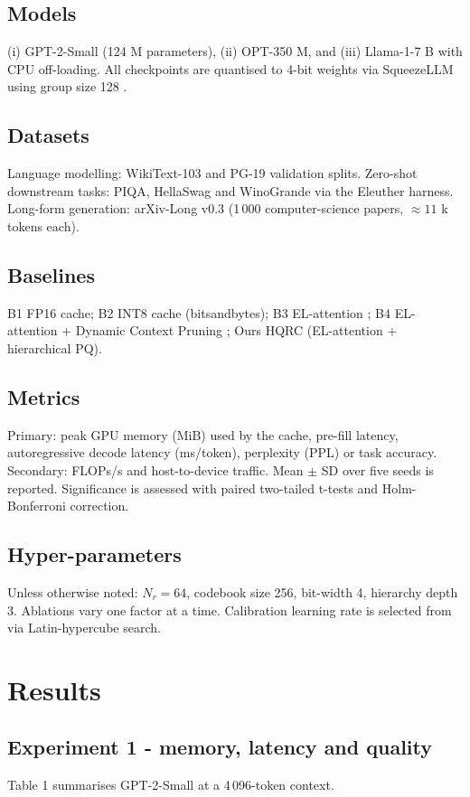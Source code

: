 \documentclass{article}
\begin{document}
\subsection{Models}
(i) GPT-2-Small (124 M parameters), (ii) OPT-350 M, and (iii) Llama-1-7 B with CPU off-loading. All checkpoints are quantised to 4-bit weights via SqueezeLLM using group size 128 \cite{kim-2023-squeezellm}.

\subsection{Datasets}
Language modelling: WikiText-103 and PG-19 validation splits. Zero-shot downstream tasks: PIQA, HellaSwag and WinoGrande via the Eleuther harness. Long-form generation: arXiv-Long v0.3 (1\,000 computer-science papers, \(\approx 11\) k tokens each).

\subsection{Baselines}
B1 FP16 cache; B2 INT8 cache (bitsandbytes); B3 EL-attention \cite{yan-2021-attention}; B4 EL-attention + Dynamic Context Pruning \cite{anagnostidis-2023-dynamic}; Ours HQRC (EL-attention + hierarchical PQ).

\subsection{Metrics}
Primary: peak GPU memory (MiB) used by the cache, pre-fill latency, autoregressive decode latency (ms/token), perplexity (PPL) or task accuracy. Secondary: FLOPs/s and host-to-device traffic. Mean \(\pm\) SD over five seeds is reported. Significance is assessed with paired two-tailed t-tests and Holm-Bonferroni correction.

\subsection{Hyper-parameters}
Unless otherwise noted: \(N_r = 64\), codebook size 256, bit-width 4, hierarchy depth 3. Ablations vary one factor at a time. Calibration learning rate is selected from via Latin-hypercube search.

\section{Results}
\subsection{Experiment 1 - memory, latency and quality}
Table 1 summarises GPT-2-Small at a 4\,096-token context.
\end{document}
